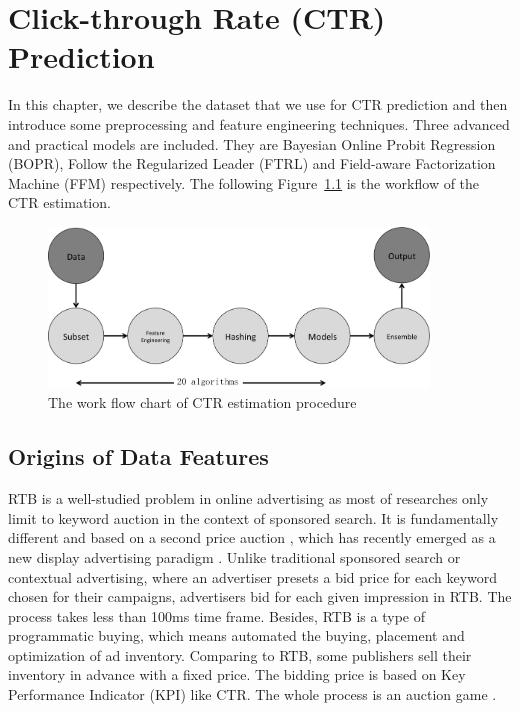 \chapter{Click-through Rate (CTR) Prediction}
\label{chapterlabel2}

In this chapter, we describe the dataset that we use for CTR prediction and then introduce some preprocessing and feature engineering techniques. Three advanced and practical models are included. They are Bayesian Online Probit Regression (BOPR), Follow the Regularized Leader (FTRL) and Field-aware Factorization Machine (FFM) respectively. The following Figure~\ref{fig:flowchart} is the workflow of the CTR estimation.

\begin{figure}[h]
\centering
\includegraphics[width=0.9\textwidth]{flowchart.png}
\caption{The work flow chart of CTR estimation procedure}
\label{fig:flowchart}
\end{figure}

\section{Origins of Data Features}
RTB is a well-studied problem in online advertising as most of researches only limit to keyword auction in the context of sponsored search. It is fundamentally different and based on a second price auction \cite{williamvickrey1961}, which has recently emerged as a new display advertising paradigm \cite{zhang2015statistical, zhang2014real, Zhang:2014:ORB:2623330.2623633}. Unlike traditional sponsored search or contextual advertising, where an advertiser presets a bid price for each keyword chosen for their campaigns, advertisers bid for each given impression in RTB. The process takes less than 100ms time frame. Besides, RTB is a type of programmatic buying, which means automated the buying, placement and optimization of ad inventory. Comparing to RTB, some publishers sell their inventory in advance with a fixed price. The bidding price is based on Key Performance Indicator (KPI) like CTR. The whole process is an auction game \cite{zhang2014real}.

